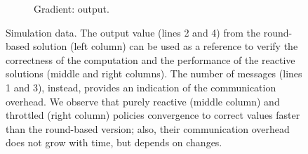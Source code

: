 \begin{figure}
\begin{subfigure}[b]{\linewidth}
      \caption{Gradient: output.}
      \label{acsos2023-frp:fig:gradient-output-rel}
  \end{subfigure}
  \caption[Simulation results of \ac{langname} simulations]{
    Simulation data.
    The output value (lines 2 and 4)
    from the round-based solution (left column) 
    can be used as a reference to verify the correctness of the computation and the performance
    of the reactive solutions (middle and right columns).
    The number of messages (lines 1 and 3), instead,
    provides an indication of the communication overhead.
    We observe that purely reactive (middle column) and throttled (right column) policies
    convergence to correct values faster than the round-based version;
    also, their communication overhead does not grow with time, but depends on changes.
  }
  \label{acsos2023-frp:fig:rel-values}
\end{figure}
